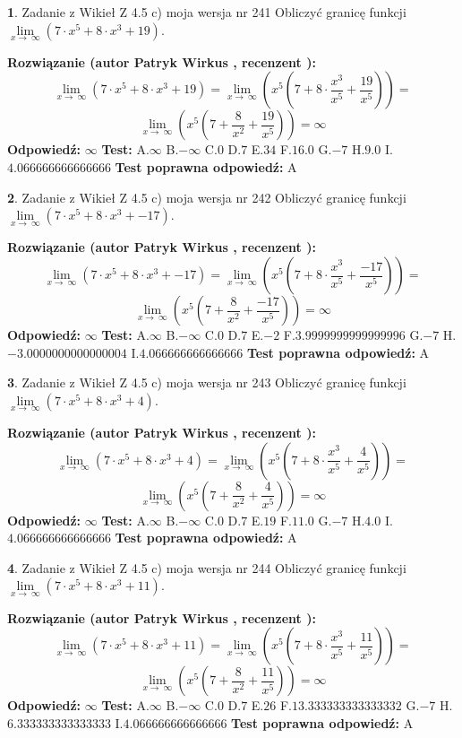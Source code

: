 \documentclass[12pt, a4paper]{article}
\theoremstyle{definition} %
\newtheorem{zad}{}
\newcommand{\zadStart}[1]{\begin{zad}#1\newline}
\newcommand{\zadStop}{\end{zad}}
\newcommand{\rozwStart}[2]{\noindent \textbf{Rozwiązanie (autor #1 , recenzent #2): }\newline}
\newcommand{\rozwStop}{\newline}
\newcommand{\odpStart}{\noindent \textbf{Odpowiedź:}\newline}
\newcommand{\odpStop}{\newline}
\newcommand{\testStart}{\noindent \textbf{Test:}\newline}
\newcommand{\testStop}{\newline}
\newcommand{\kluczStart}{\noindent \textbf{Test poprawna odpowiedź:}\newline}
\newcommand{\kluczStop}{\newline}
\begin{document}
\zadStart{Zadanie z Wikieł Z 4.5 c) moja wersja nr 241}
Obliczyć granicę funkcji  $\lim\limits_{x\to\ \infty}(7 \cdot x^{5}+8 \cdot x^{3}+19)$.
\zadStop
\rozwStart{Patryk Wirkus}{}
$$\lim\limits_{x\to\ \infty}(7 \cdot x^{5}+8 \cdot x^{3}+19) = \lim\limits_{x\to\ \infty}(x^{5}(7 +8 \cdot \frac{x^{3}}{x^{5}}+\frac{19}{x^{5}})) =$$ $$\lim\limits_{x\to\ \infty}(x^{5}(7 +\frac{8}{x^{2}}+\frac{19}{x^{5}})) =\infty$$
\rozwStop
\odpStart
$\infty$
\odpStop
\testStart
A.$\infty$ B.$-\infty$ C.$0$ D.$7$ E.$34$
F.$16.0$ G.$-7$
H.$9.0$
I.$4.066666666666666$
\testStop
\kluczStart
A
\kluczStop



\zadStart{Zadanie z Wikieł Z 4.5 c) moja wersja nr 242}
Obliczyć granicę funkcji  $\lim\limits_{x\to\ \infty}(7 \cdot x^{5}+8 \cdot x^{3}+-17)$.
\zadStop
\rozwStart{Patryk Wirkus}{}
$$\lim\limits_{x\to\ \infty}(7 \cdot x^{5}+8 \cdot x^{3}+-17) = \lim\limits_{x\to\ \infty}(x^{5}(7 +8 \cdot \frac{x^{3}}{x^{5}}+\frac{-17}{x^{5}})) =$$ $$\lim\limits_{x\to\ \infty}(x^{5}(7 +\frac{8}{x^{2}}+\frac{-17}{x^{5}})) =\infty$$
\rozwStop
\odpStart
$\infty$
\odpStop
\testStart
A.$\infty$ B.$-\infty$ C.$0$ D.$7$ E.$-2$
F.$3.9999999999999996$ G.$-7$
H.$-3.0000000000000004$
I.$4.066666666666666$
\testStop
\kluczStart
A
\kluczStop



\zadStart{Zadanie z Wikieł Z 4.5 c) moja wersja nr 243}
Obliczyć granicę funkcji  $\lim\limits_{x\to\ \infty}(7 \cdot x^{5}+8 \cdot x^{3}+4)$.
\zadStop
\rozwStart{Patryk Wirkus}{}
$$\lim\limits_{x\to\ \infty}(7 \cdot x^{5}+8 \cdot x^{3}+4) = \lim\limits_{x\to\ \infty}(x^{5}(7 +8 \cdot \frac{x^{3}}{x^{5}}+\frac{4}{x^{5}})) =$$ $$\lim\limits_{x\to\ \infty}(x^{5}(7 +\frac{8}{x^{2}}+\frac{4}{x^{5}})) =\infty$$
\rozwStop
\odpStart
$\infty$
\odpStop
\testStart
A.$\infty$ B.$-\infty$ C.$0$ D.$7$ E.$19$
F.$11.0$ G.$-7$
H.$4.0$
I.$4.066666666666666$
\testStop
\kluczStart
A
\kluczStop



\zadStart{Zadanie z Wikieł Z 4.5 c) moja wersja nr 244}
Obliczyć granicę funkcji  $\lim\limits_{x\to\ \infty}(7 \cdot x^{5}+8 \cdot x^{3}+11)$.
\zadStop
\rozwStart{Patryk Wirkus}{}
$$\lim\limits_{x\to\ \infty}(7 \cdot x^{5}+8 \cdot x^{3}+11) = \lim\limits_{x\to\ \infty}(x^{5}(7 +8 \cdot \frac{x^{3}}{x^{5}}+\frac{11}{x^{5}})) =$$ $$\lim\limits_{x\to\ \infty}(x^{5}(7 +\frac{8}{x^{2}}+\frac{11}{x^{5}})) =\infty$$
\rozwStop
\odpStart
$\infty$
\odpStop
\testStart
A.$\infty$ B.$-\infty$ C.$0$ D.$7$ E.$26$
F.$13.333333333333332$ G.$-7$
H.$6.333333333333333$
I.$4.066666666666666$
\testStop
\kluczStart
A
\kluczStop
\end{document}
